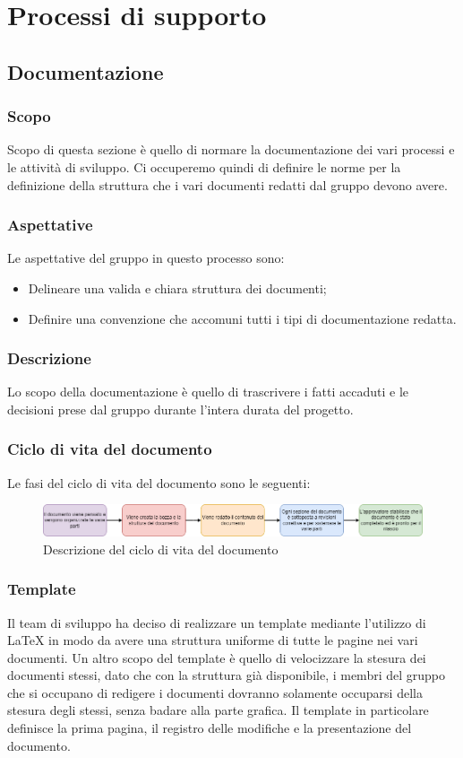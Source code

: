 \section{Processi di supporto}\label{section:processi_supporto}
\subsection{Documentazione}\label{subsection: documentazione}
\subsubsection{Scopo}\label{subsubsection: scopo}
Scopo di questa sezione è quello di normare la documentazione dei vari processi e le attività di sviluppo.
Ci occuperemo quindi di definire le norme per la definizione della struttura che i vari documenti redatti dal gruppo \groupName{} devono avere.
\subsubsection{Aspettative}
Le aspettative del gruppo \groupName{} in questo processo sono:
\begin{itemize}
    \item Delineare una valida e chiara struttura dei documenti;
    \item Definire una convenzione che accomuni tutti i tipi di documentazione redatta.
 \end {itemize}
\subsubsection{Descrizione}
Lo scopo della documentazione è quello di trascrivere i fatti accaduti e le decisioni prese dal gruppo durante l'intera durata del progetto.
\subsubsection{Ciclo di vita del documento}
Le fasi del ciclo di vita del documento sono le seguenti:
      \begin{figure}[htbp]
         \centering 
         \includegraphics[scale = 0.5]{../template/images/NdP/CicloDiVitaDocumento.png}
         \caption{Descrizione del ciclo di vita del documento}
      \end {figure}
\subsubsection{Template}
Il team di sviluppo ha deciso di realizzare un template mediante l'utilizzo di \LaTeX{} in modo da avere una struttura uniforme di tutte le pagine nei vari documenti.
Un altro scopo del template è quello di velocizzare la stesura dei documenti stessi, dato che con la struttura già disponibile, i membri del gruppo che si occupano di redigere i documenti dovranno solamente occuparsi della stesura degli stessi, senza badare alla parte grafica.
Il template in particolare definisce la prima pagina, il registro delle modifiche e la presentazione del documento.
